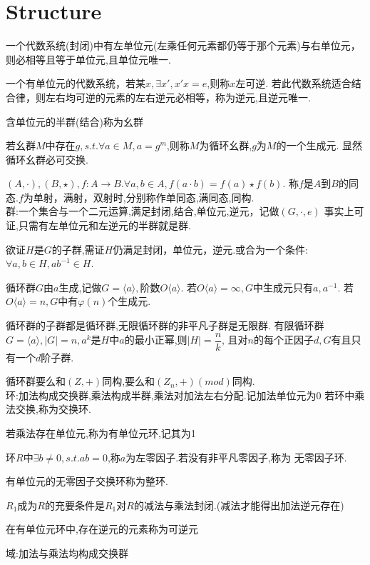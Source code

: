 \section{Structure}
一个代数系统(封闭)中有左单位元(左乘任何元素都仍等于那个元素)与右单位元，则必相等且等于单位元,且单位元唯一.

一个有单位元的代数系统，若某$ x,\exists x', x'x=e$,则称$ x$左可逆.
若此代数系统适合结合律，则左右均可逆的元素的左右逆元必相等，称为逆元,且逆元唯一.

含单位元的半群(结合)称为幺群

若幺群$ M$中存在$ g,s.t.\forall a\in M, a=g^m$,则称$ M$为循环幺群,$ g$为$ M$的一个生成元.
显然循环幺群必可交换.

$ (A, \cdot), (B, \star),f:A \rightarrow B. \forall a,b \in A, f(a \cdot b)=f(a)\star f(b).$
称$ f$是$ A$到$ B$的同态.$ f$为单射，满射，双射时,分别称作单同态,满同态,同构.
\\

群:一个集合与一个二元运算,满足封闭,结合,单位元,逆元，记做$ (G, \cdot, e)$
事实上可证,只需有左单位元和左逆元的半群就是群.

欲证$ H$是$ G$的子群,需证$ H$仍满足封闭，单位元，逆元.或合为一个条件:$ \forall a,b\in H, ab^{-1} \in H$.

循环群$ G$由$ a$生成,记做$ G=\langle a \rangle,$阶数$ O\langle a \rangle$.
若$ O \langle a \rangle = \infty, G$中生成元只有$ a,a^{-1}.$
若$ O \langle a \rangle = n ,G$中有$ \varphi(n)$个生成元.

循环群的子群都是循环群,无限循环群的非平凡子群是无限群.
有限循环群$ G=\langle a \rangle,|G|=n,a^k$是$ H$中$ a$的最小正幂,则$ |H| = \dfrac{n}{k}$,
且对$ n$的每个正因子$ d,G$有且只有一个$ d$阶子群.

循环群要么和$ (Z, +)$同构,要么和$ (Z_n, +)(mod)$同构.
\\

环:加法构成交换群,乘法构成半群,乘法对加法左右分配.记加法单位元为0
若环中乘法交换,称为交换环.

若乘法存在单位元,称为有单位元环,记其为1

环$ R$中$\exists b\ne 0,s.t.ab=0$,称$ a$为左零因子.若没有非平凡零因子,称为
无零因子环.

有单位元的无零因子交换环称为整环.

$ R_1$成为$ R$的充要条件是$ R_1$对$ R$的减法与乘法封闭.(减法才能得出加法逆元存在)

在有单位元环中,存在逆元的元素称为可逆元

域:加法与乘法均构成交换群
\\

